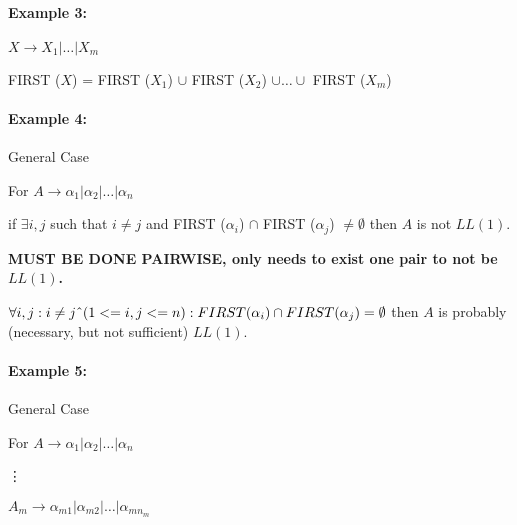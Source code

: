 \documentclass[twocolumn]{article}
\begin{document}
\paragraph*{Example 3:}

$X \to X_1 | \dots | X_m$

FIRST ($X$) = FIRST ($X_1$) $\cup$ FIRST ($X_2$) $\cup \dots \cup$ FIRST ($X_m$)


\paragraph*{Example 4: }
General Case

For $A \to \alpha _1 | \alpha _2 | \dots | \alpha _n$

if $\exists i, j$ such that $i \neq j$ and FIRST ($\alpha _i$) $\cap$ FIRST ($\alpha _j$) $\neq \emptyset$ then $A$ is not $LL(1)$.

\textbf{MUST BE DONE PAIRWISE, only needs to exist one pair to not be $LL(1)$.}

$\forall i, j: i \neq j \string^ (1 <= i, j <= n): FIRST (\alpha _i) \cap FIRST (\alpha _j) = \emptyset$ then $A$ is probably (necessary, but not sufficient) $LL(1)$.

\paragraph*{Example 5:}
General Case

For $A \to \alpha _1 | \alpha _2 | \dots | \alpha _n$

\vdots

$A_m \to \alpha _{m1} | \alpha _{m2} | \dots | \alpha _{mn_m}$
\end{document}
